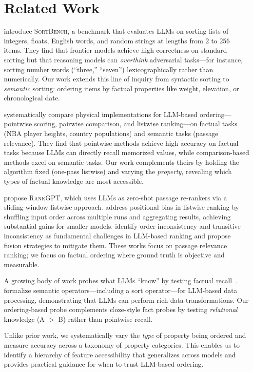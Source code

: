 \section{Related Work}
\label{sec:related}

\citet{herbold2025sortbench} introduce \textsc{SortBench}, a benchmark that evaluates LLMs on sorting lists of integers, floats, English words, and random strings at lengths from 2 to 256 items.
They find that frontier models achieve high correctness on standard sorting but that reasoning models can \emph{overthink} adversarial tasks---for instance, sorting number words (``three,'' ``seven'') lexicographically rather than numerically.
Our work extends this line of inquiry from syntactic sorting to \emph{semantic} sorting: ordering items by factual properties like weight, elevation, or chronological date.

\citet{zhao2025access} systematically compare physical implementations for LLM-based ordering---pointwise scoring, pairwise comparison, and listwise ranking---on factual tasks (NBA player heights, country populations) and semantic tasks (passage relevance).
They find that pointwise methods achieve high accuracy on factual tasks because LLMs can directly recall memorized values, while comparison-based methods excel on semantic tasks.
Our work complements theirs by holding the algorithm fixed (one-pass listwise) and varying the \emph{property}, revealing which types of factual knowledge are most accessible.

\citet{sun2023chatgpt} propose \textsc{RankGPT}, which uses LLMs as zero-shot passage re-rankers via a sliding-window listwise approach.
\citet{tang2023found} address positional bias in listwise ranking by shuffling input order across multiple runs and aggregating results, achieving substantial gains for smaller models.
\citet{zeng2024rankfusion} identify order inconsistency and transitive inconsistency as fundamental challenges in LLM-based ranking and propose fusion strategies to mitigate them.
These works focus on passage relevance ranking; we focus on factual ordering where ground truth is objective and measurable.

A growing body of work probes what LLMs ``know'' by testing factual recall~\cite{suzgun2022challenging}.
\citet{patel2025semantic} formalize semantic operators---including a sort operator---for LLM-based data processing, demonstrating that LLMs can perform rich data transformations.
Our ordering-based probe complements cloze-style fact probes by testing \emph{relational} knowledge (A $>$ B) rather than pointwise recall.

Unlike prior work, we systematically vary the \emph{type} of property being ordered and measure accuracy across a taxonomy of property categories.
This enables us to identify a hierarchy of feature accessibility that generalizes across models and provides practical guidance for when to trust LLM-based ordering.
